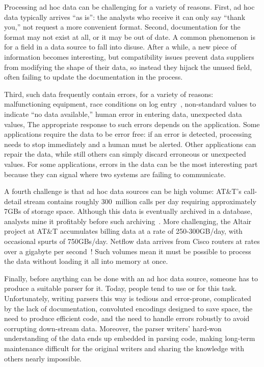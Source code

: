 \documentclass[times]{acm-sigplan}
\newcommand{\ningaui}{Altair}
\begin{document}
Processing ad hoc data can be challenging for a variety of
reasons. First, ad hoc data typically arrives ``as is'': the analysts
who receive it can only say ``thank you,'' not request a more convenient format. 
Second, documentation for the format may not exist at all, or it may be
out of date.  A common phenomenon is for a field in a
data source to fall into disuse.  After a while, a new piece of
information becomes interesting, but compatibility issues prevent 
data suppliers from modifying the
shape of their data, so instead they hijack the unused field, often
failing to update the documentation in the process.

Third, such data frequently contain errors, for a variety of
reasons: malfunctioning equipment, race conditions on log
entry~\cite{wpp}, non-standard values to indicate ``no data
available,'' human error in entering data, unexpected data
values, \etc{} The appropriate response to such errors depends on the application. Some applications require the data to be error free: 
if an error is detected, processing needs to stop immediately and a human
must be alerted.  Other applications can repair the data, while still
others can simply discard erroneous or unexpected values.  
For some applications,
errors in the data can be the most interesting part  because
they can signal where two systems are failing to communicate.

A fourth challenge is that ad hoc data sources can be high volume:
AT\&T's call-detail stream contains roughly 300~million calls per day
requiring approximately 7GBs of storage space. Although this data is
eventually archived in a database, analysts mine it profitably before
such archiving~\cite{kdd98,kdd99}. More challenging, the \ningaui{} project at AT\&T
accumulates billing data at a rate
of 250-300GB/day, with occasional spurts of 750GBs/day. Netflow data
arrives from Cisco routers at rates over a gigabyte per
second~\cite{gigascope}! Such volumes mean it must be possible to
process the data without loading it all into memory at once.

Finally, before anything can be done with an ad hoc data source,
someone has to produce a suitable parser for it.
Today, people tend to use \C{} or \perl{} for this task.
Unfortunately, writing
parsers this way is tedious and error-prone, complicated by the lack
of documentation, convoluted encodings designed to save space, 
the need to produce efficient code,
and the need to handle errors robustly to avoid corrupting down-stream data.
Moreover, the parser writers' hard-won understanding of the data
ends up embedded in parsing code, making long-term maintenance
difficult for the original writers and sharing the knowledge with
others nearly impossible.
\end{document}
